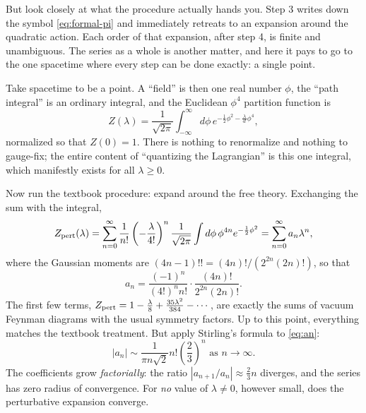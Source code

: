 But look closely at what the procedure actually hands you. Step 3 writes down
the symbol \eqref{eq:formal-pi} and immediately retreats to an expansion around
the quadratic action. Each order of that expansion, after step 4, is finite and
unambiguous. The series as a whole is another matter, and here it pays to go to
the one spacetime where every step can be done exactly: a single point.

\begin{eexample}
\label{ex:zero-d}
Take spacetime to be a point. A ``field'' is then one real number $\phi$, the
``path integral'' is an ordinary integral, and the Euclidean $\phi^4$ partition
function is
\begin{equation}
Z(\lambda) = \frac{1}{\sqrt{2\pi}}\int_{-\infty}^{\infty} d\phi\,
  e^{-\frac{1}{2}\phi^2 - \frac{\lambda}{4!}\phi^4},
\label{eq:zerod-Z}
\end{equation}
normalized so that $Z(0) = 1$. There is nothing to renormalize and nothing to
gauge-fix; the entire content of ``quantizing the Lagrangian'' is this one
integral, which manifestly exists for all $\lambda \ge 0$.

Now run the textbook procedure: expand around the free theory. Exchanging the
sum with the integral,
\begin{equation}
Z_{\rm pert}(\lambda) = \sum_{n=0}^{\infty} \frac{1}{n!}
  \left(-\frac{\lambda}{4!}\right)^{n} \frac{1}{\sqrt{2\pi}}\int d\phi\,
  \phi^{4n} e^{-\frac{1}{2}\phi^2}
  = \sum_{n=0}^{\infty} a_n \lambda^n ,
\end{equation}
where the Gaussian moments are $(4n-1)!! = (4n)!/\left(2^{2n}(2n)!\right)$, so that
\begin{equation}
a_n = \frac{(-1)^n}{(4!)^n n!} \cdot \frac{(4n)!}{2^{2n}(2n)!}.
\label{eq:an}
\end{equation}
The first few terms, $Z_{\rm pert} = 1 - \frac{\lambda}{8} +
\frac{35\lambda^2}{384} - \cdots$, are exactly the sums of vacuum Feynman
diagrams with the usual symmetry factors. Up to this point, everything
matches the textbook treatment. But apply
Stirling's formula to \eqref{eq:an}:
\begin{equation}
|a_n| \sim \frac{1}{\pi n \sqrt{2}} n! \left(\frac{2}{3}\right)^{n}
\text{ as } n \to \infty.
\label{eq:an-asymptotic}
\end{equation}
The coefficients grow \emph{factorially}: the ratio $|a_{n+1}/a_n| \approx
\tfrac{2}{3}n$ diverges, and the series has zero radius of convergence. For
\emph{no} value of $\lambda \neq 0$, however small, does the perturbative
expansion converge.


\end{eexample}
